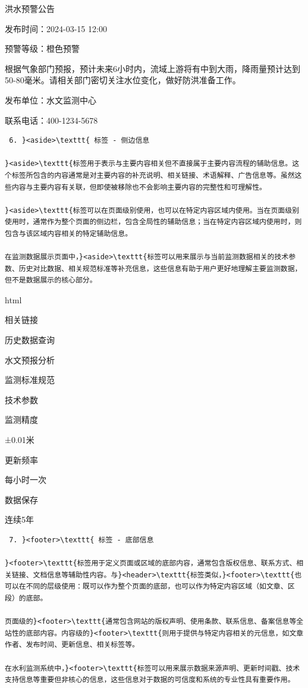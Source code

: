 洪水预警公告

发布时间：2024-03-15 12:00

预警等级：橙色预警

根据气象部门预报，预计未来6小时内，流域上游将有中到大雨，降雨量预计达到50-80毫米。请相关部门密切关注水位变化，做好防洪准备工作。

发布单位：水文监测中心

联系电话：400-1234-5678

\begin{lstlisting}
 6. }<aside>\texttt{ 标签 - 侧边信息

}<aside>\texttt{标签用于表示与主要内容相关但不直接属于主要内容流程的辅助信息。这个标签所包含的内容通常是对主要内容的补充说明、相关链接、术语解释、广告信息等。虽然这些内容与主要内容有关联，但即使被移除也不会影响主要内容的完整性和可理解性。

}<aside>\texttt{标签可以在页面级别使用，也可以在特定内容区域内使用。当在页面级别使用时，通常作为整个页面的侧边栏，包含全局性的辅助信息；当在特定内容区域内使用时，则包含与该区域内容相关的特定辅助信息。

在监测数据展示页面中，}<aside>\texttt{标签可以用来展示与当前监测数据相关的技术参数、历史对比数据、相关规范标准等补充信息，这些信息有助于用户更好地理解主要监测数据，但不是数据展示的核心部分。
\end{lstlisting}

html

相关链接

历史数据查询

水文预报分析

监测标准规范

技术参数

监测精度

±0.01米

更新频率

每小时一次

数据保存

连续5年

\begin{lstlisting}
 7. }<footer>\texttt{ 标签 - 底部信息

}<footer>\texttt{标签用于定义页面或区域的底部内容，通常包含版权信息、联系方式、相关链接、文档信息等辅助性内容。与}<header>\texttt{标签类似，}<footer>\texttt{也可以在不同的层级使用：既可以作为整个页面的底部，也可以作为特定内容区域（如文章、区段）的底部。

页面级的}<footer>\texttt{通常包含网站的版权声明、使用条款、联系信息、备案信息等全站性的底部内容。内容级的}<footer>\texttt{则用于提供与特定内容相关的元信息，如文章作者、发布时间、更新信息、相关标签等。

在水利监测系统中，}<footer>\texttt{标签可以用来展示数据来源声明、更新时间戳、技术支持信息等重要但非核心的信息，这些信息对于数据的可信度和系统的专业性具有重要作用。
\end{lstlisting}

